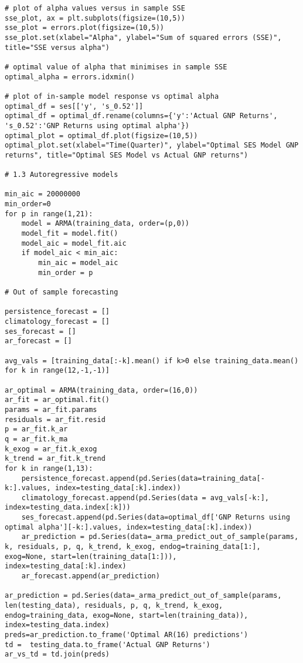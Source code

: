 \documentclass{article}
\begin{document}
\begin{lstlisting}
# plot of alpha values versus in sample SSE
sse_plot, ax = plt.subplots(figsize=(10,5))
sse_plot = errors.plot(figsize=(10,5))
sse_plot.set(xlabel="Alpha", ylabel="Sum of squared errors (SSE)", title="SSE versus alpha")

# optimal value of alpha that minimises in sample SSE
optimal_alpha = errors.idxmin()

# plot of in-sample model response vs optimal alpha 
optimal_df = ses[['y', 's_0.52']]
optimal_df = optimal_df.rename(columns={'y':'Actual GNP Returns', 's_0.52':'GNP Returns using optimal alpha'})
optimal_plot = optimal_df.plot(figsize=(10,5))
optimal_plot.set(xlabel="Time(Quarter)", ylabel="Optimal SES Model GNP returns", title="Optimal SES Model vs Actual GNP returns")

# 1.3 Autoregressive models

min_aic = 20000000
min_order=0
for p in range(1,21):
	model = ARMA(training_data, order=(p,0))
	model_fit = model.fit()
	model_aic = model_fit.aic
	if model_aic < min_aic:
		min_aic = model_aic
		min_order = p

# Out of sample forecasting

persistence_forecast = []
climatology_forecast = []
ses_forecast = []
ar_forecast = []

avg_vals = [training_data[:-k].mean() if k>0 else training_data.mean() for k in range(12,-1,-1)]

ar_optimal = ARMA(training_data, order=(16,0))
ar_fit = ar_optimal.fit()
params = ar_fit.params
residuals = ar_fit.resid
p = ar_fit.k_ar
q = ar_fit.k_ma
k_exog = ar_fit.k_exog
k_trend = ar_fit.k_trend
for k in range(1,13):
	persistence_forecast.append(pd.Series(data=training_data[-k:].values, index=testing_data[:k].index))
	climatology_forecast.append(pd.Series(data = avg_vals[-k:], index=testing_data.index[:k]))
	ses_forecast.append(pd.Series(data=optimal_df['GNP Returns using optimal alpha'][-k:].values, index=testing_data[:k].index))
	ar_prediction = pd.Series(data=_arma_predict_out_of_sample(params, k, residuals, p, q, k_trend, k_exog, endog=training_data[1:], exog=None, start=len(training_data[1:])), index=testing_data[:k].index)
	ar_forecast.append(ar_prediction)

ar_prediction = pd.Series(data=_arma_predict_out_of_sample(params, len(testing_data), residuals, p, q, k_trend, k_exog, endog=training_data, exog=None, start=len(training_data)), index=testing_data.index)
preds=ar_prediction.to_frame('Optimal AR(16) predictions')
td =  testing_data.to_frame('Actual GNP Returns')
ar_vs_td = td.join(preds)


\end{lstlisting}
\end{document}
